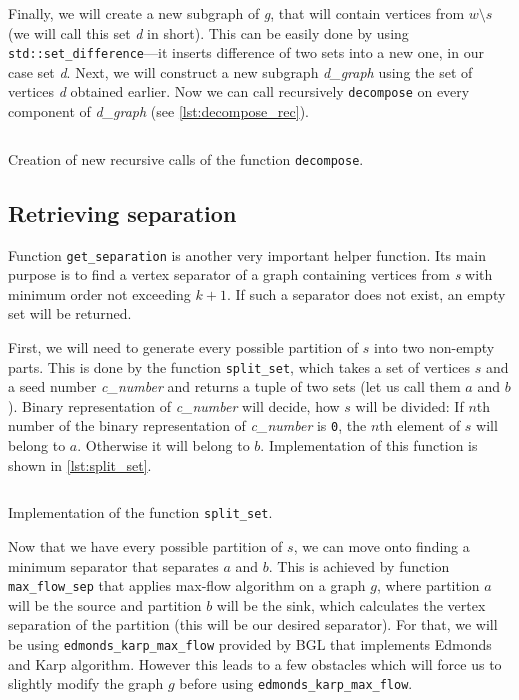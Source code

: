 \documentclass[thesis=B,english]{FITthesis}[2019/03/21]
\begin{document}
Finally, we will create a new subgraph of \emph{g}, that will contain vertices from $w \setminus s$ (we will call this set \emph{d} in short). This can be easily done by using \texttt{std::set\_difference}---it inserts difference of two sets into a new one, in our case set \emph{d}. Next, we will construct a new subgraph \emph{d\_graph} using the set of vertices \emph{d} obtained earlier. Now we can call recursively \texttt{decompose} on every component of \emph{d\_graph} (see \autoref{lst:decompose_rec}).

\begin{listing}[H]
	\inputminted[tabsize=2,breaklines,bgcolor=codebg]{c++}{snippets/decompose_rec.m}
	\caption[Creation of new recursive calls of the function \texttt{decompose}]{Creation of new recursive calls of the function \texttt{decompose}.}
	\label{lst:decompose_rec}
\end{listing}

\subsection{Retrieving separation}\label{ssec:retrieving_separation}
Function \texttt{get\_separation} is another very important helper function. Its main purpose is to find a vertex separator of a graph containing vertices from \emph{s} with minimum order not exceeding $k+1$. If such a separator does not exist, an empty set will be returned.

First, we will need to generate every possible partition of $s$ into two non-empty parts. This is done by the function \texttt{split\_set}, which takes a set of vertices $s$ and a seed number \emph{c\_number} and returns a tuple of two sets (let us call them $a$ and $b$). Binary representation of \emph{c\_number} will decide, how $s$ will be divided: If $n$th number of the binary representation of \emph{c\_number} is \texttt{0}, the $n$th element of $s$ will belong to $a$. Otherwise it will belong to $b$. Implementation of this function is shown in \autoref{lst:split_set}.

\begin{listing}[H]
	\inputminted[tabsize=2,breaklines,bgcolor=codebg]{c++}{snippets/split_set.m}
	\caption[Implementation of the function \texttt{split\_set}]{Implementation of the function \texttt{split\_set}.}
	\label{lst:split_set}
\end{listing}

Now that we have every possible partition of $s$, we can move onto finding a minimum separator that separates $a$ and $b$. This is achieved by function \texttt{max\_flow\_sep} that applies max-flow algorithm on a graph $g$, where partition $a$ will be the source and partition $b$ will be the sink, which calculates the vertex separation of the partition (this will be our desired separator). For that, we will be using \texttt{edmonds\_karp\_max\_flow} provided by BGL that implements Edmonds and Karp algorithm. However this leads to a few obstacles which will force us to slightly modify the graph $g$ before using \texttt{edmonds\_karp\_max\_flow}.
\end{document}
